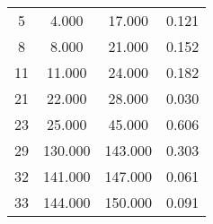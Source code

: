 % 
\begin{tabular}{cccc}
  \hline
  \hline
5 & 4.000 & 17.000 & 0.121 \\ 
  8 & 8.000 & 21.000 & 0.152 \\ 
  11 & 11.000 & 24.000 & 0.182 \\ 
  21 & 22.000 & 28.000 & 0.030 \\ 
  23 & 25.000 & 45.000 & 0.606 \\ 
  29 & 130.000 & 143.000 & 0.303 \\ 
  32 & 141.000 & 147.000 & 0.061 \\ 
  33 & 144.000 & 150.000 & 0.091 \\ 
   \hline
\end{tabular}
